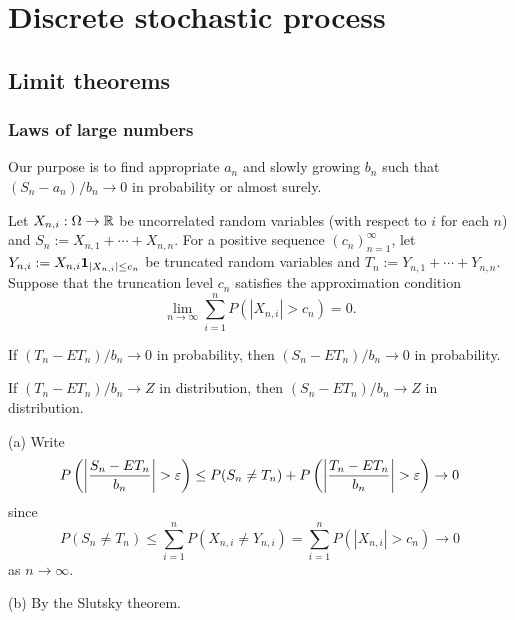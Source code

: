 \documentclass{../note}
\begin{document}
\part{Discrete stochastic process}


\chapter{Limit theorems}

\section{Laws of large numbers}


Our purpose is to find appropriate $a_n$ and slowly growing $b_n$ such that $(S_n-a_n)/b_n\to0$ in probability or almost surely.


\begin{prb}
Let $X_{n,i}:\Omega\to\mathbb{R}$ be uncorrelated random variables (with respect to $i$ for each $n$) and $S_n:=X_{n,1}+\cdots+X_{n,n}$.
For a positive sequence $(c_n)_{n=1}^\infty$, let $Y_{n,i}:=X_{n,i}\mathbf{1}_{|X_{n,i}|\le c_n}$ be truncated random variables and $T_n:=Y_{n,1}+\cdots+Y_{n,n}$.
Suppose that the truncation level $c_n$ satisfies the approximation condition
\[\lim_{n\to\infty}\sum_{i=1}^nP(|X_{n,i}|>c_n)=0.\]
\begin{parts}
\item If $(T_n-ET_n)/b_n\to0$ in probability, then $(S_n-ET_n)/b_n\to0$ in probability.
\item If $(T_n-ET_n)/b_n\to Z$ in distribution, then $(S_n-ET_n)/b_n\to Z$ in distribution.
\end{parts}
\end{prb}
\begin{pf}
(a)
Write
\[P\left(\left|\frac{S_n-ET_n}{b_n}\right|>\e\right)
\le P(S_n\ne T_n)+P\left(\left|\frac{T_n-ET_n}{b_n}\right|>\e\right)\to0\]
since
\[P(S_n\ne T_n)\le\sum_{i=1}^nP(X_{n,i}\ne Y_{n,i})=\sum_{i=1}^nP(|X_{n,i}|>c_n)\to0\]
as $n\to\infty$.

(b)
By the Slutsky theorem.
\end{pf}
\end{document}
